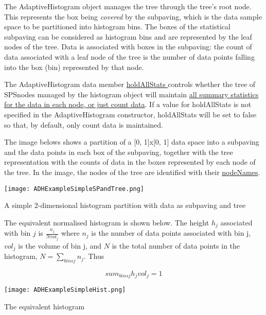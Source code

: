 \-The \-Adaptive\-Histogram object manages the tree through the tree's root node. \-This represents the box being {\itshape covered\/} by the subpaving, which is the data sample space to be partitioned into histogram bins. \-The boxes of the statistical subpaving can be considered as histogram bins and are represented by the leaf nodes of the tree. \-Data is associated with boxes in the subpaving\-: the count of data associated with a leaf node of the tree is the number of data points falling into the box (bin) represented by that node.

\label{AdaptiveHistograms_ADHholdallstats}%
\hypertarget{AdaptiveHistograms_ADHholdallstats}{}%
\-The \-Adaptive\-Histogram data member \hyperlink{}{hold\-All\-Stats } controls whether the tree of \-S\-P\-Snodes managed by the histogram object will maintain \hyperlink{StatsSubPavings_SPScountsonly}{all summary statistics for the data in each node, or just count data}. \-If a value for hold\-All\-Stats is not specified in the \-Adaptive\-Histogram constructor, hold\-All\-Stats will be set to false so that, by default, only count data is maintained.

\-The image belows shows a partition of a \mbox{[}0, 1\mbox{]}x\mbox{[}0, 1\mbox{]} data space into a subpaving and the data points in each box of the subpaving, together with the tree representation with the counts of data in the boxes represented by each node of the tree. \-In the image, the nodes of the tree are identified with their \hyperlink{newsubpavings_SPnodename}{node\-Names}.

 
\begin{DoxyImage}
\texttt{[image: ADHExampleSimpleSPandTree.png]}
\caption{\-A simple 2-\/dimensional histogram partition with data as subpaving and tree}
\end{DoxyImage}


\-The equivalent normalised histogram is shown below. \-The height $ h_j $ associated with bin $ j $ is $ \frac{n_j}{Nvol_j} $ where $ n_j $ is the number of data points associated with bin j, $ vol_j $ is the volume of bin j, and $ N $ is the total number of data points in the histogram, $ N = \sum_{bins j} n_j $. \-Thus

\[ sum_{bins j} h_jvol_j = 1 \]

 
\begin{DoxyImage}
\texttt{[image: ADHExampleSimpleHist.png]}
\caption{\-The equivalent histogram}
\end{DoxyImage}


